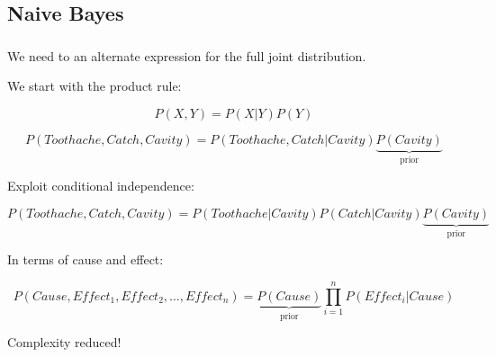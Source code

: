 \subsection{Naive Bayes}

\begin{frame}\frametitle{\subsecname}

We need to an alternate expression for the full joint distribution.

We start with the product rule:

\begin{equation}
P(X,Y) = P(X|Y)P(Y)    
\end{equation}

\begin{equation}
P(Toothache,Catch,Cavity) = P(Toothache,Catch|Cavity)\underbrace{P(Cavity)}_{\text{prior}} 
\end{equation}

Exploit conditional independence:

\begin{equation}
P(Toothache,Catch,Cavity) = P(Toothache|Cavity)P(Catch|Cavity) \underbrace{P(Cavity)}_{\text{prior}} 
\end{equation}

In terms of cause and effect:

\begin{equation}
P(Cause,Effect_1,Effect_2,\ldots,Effect_n) = \underbrace{P(Cause)}_{\text{prior}} \prod_{i=1}^{n} P(Effect_{i}|Cause)
\end{equation}


Complexity reduced!

\end{frame}
